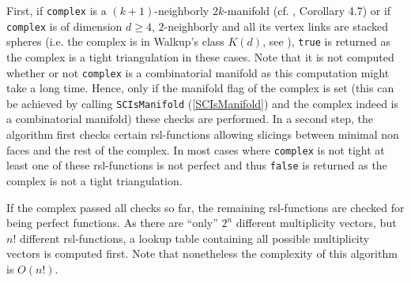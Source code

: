\documentclass[a4paper,11pt]{report}
\begin{document}
{{{ First, if \texttt{complex} is a $(k+1)$-neighborly $2k$-manifold (cf. \cite{Kuehnel95TightPolySubm}, Corollary 4.7) or if \texttt{complex} is of dimension $d\geq 4$, $2$-neighborly and all its vertex links are stacked spheres (i.e. the complex is
in Walkup's class $K(d)$, see \cite{Effenberger09StackPolyTightTrigMnf}), \texttt{true} is returned as the complex is a tight triangulation in these cases. Note that
it is not computed whether or not \texttt{complex} is a combinatorial manifold as this computation might take a long time. Hence,
only if the manifold flag of the complex is set (this can be achieved by
calling \texttt{SCIsManifold} (\ref{SCIsManifold}) and the complex indeed is a combinatorial manifold) these checks are
performed. In a second step, the algorithm first checks certain rsl-functions
allowing slicings between minimal non faces and the rest of the complex. In
most cases where \texttt{complex} is not tight at least one of these rsl-functions is not perfect and thus \texttt{false} is returned as the complex is not a tight triangulation.

 If the complex passed all checks so far, the remaining rsl-functions are
checked for being perfect functions. As there are ``only'' $2^n$ different multiplicity vectors, but $n!$ different rsl-functions, a lookup table containing all possible multiplicity
vectors is computed first. Note that nonetheless the complexity of this
algorithm is $O(n!)$.

}}}
\end{document}
